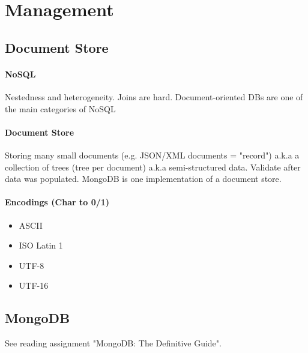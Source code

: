 \section{Management}

\subsection{Document Store}

\paragraph{NoSQL}
Nestedness and heterogeneity. Joins are hard. Document-oriented DBs are one of the main categories of NoSQL

\paragraph{Document Store}
Storing many small documents (e.g. JSON/XML documents = "record") a.k.a a collection of trees (tree per document) a.k.a semi-structured data. Validate after data was populated. MongoDB is one implementation of a document store.

\paragraph{Encodings (Char to 0/1)}
\begin{itemize}
    \item ASCII
    \item ISO Latin 1
    \item UTF-8
    \item UTF-16
\end{itemize} %


\subsection{MongoDB}

See reading assignment "MongoDB: The Definitive Guide".


